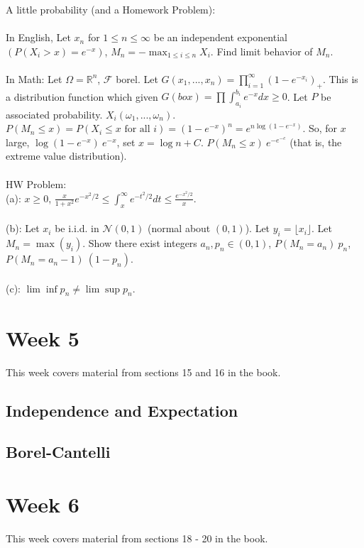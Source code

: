 \documentclass[12pt]{article}
\begin{document}
A little probability (and a Homework Problem):
\\ \\
In English, Let $x_n$ for $1 \le n \le \infty$ be an independent exponential $(P(X_i > x) = e^{-x})$, $M_n = -\max_{1 \le i \le n} X_i$.  Find limit behavior of $M_n$.
\\ \\
In Math: Let $\Omega = \mathbb{R}^n$, $\mathcal{F}$ borel.  Let $G(x_1, ..., x_n) = \prod_{i=1}^\infty (1 - e^{-x_i})_+$.  This is a distribution function which given $G(box) = \prod \int_{a_i}^{b_i} e^{-x} dx \ge 0$.  Let $P$ be associated probability.  $X_i(\omega_1, ..., \omega_n)$.  $P(M_n \le x) = P(X_i \le x \textrm{ for all } i) = (1 - e^{-x})^n = e^{n \log(1 - e^{-x})}$.  So, for $x$ large, $\log(1 - e^{-x}) ~ e^{-x}$, set $x = \log n + C$.  $P(M_n \le x) ~ e^{-e^{-c}}$ (that is, the extreme value distribution).
\\ \\
HW Problem: \\
(a): $x \ge 0$, $\frac{x}{1 + x^2} e^{-x^2/2} \le \int_x^\infty e^{-t^2/2} dt \le \frac{e^{-x^2/2}}{x}$.  \\ \\
(b): Let $x_i$ be i.i.d. in $\mathcal{N}(0,1)$ (normal about $(0,1)$).  Let $y_i = \lfloor x_i \rfloor$.  Let $M_n = \max(y_i)$.  Show there exist integers $a_n, p_n \in (0,1)$, $P(M_n = a_n) ~ p_n$, $P(M_n = a_n - 1) ~ (1 - p_n)$. \\ \\
(c):  $\lim \inf p_n \neq \lim \sup p_n$.

\section{Week 5}
This week covers material from sections 15 and 16 in the book.

\subsection{Independence and Expectation}

\subsection{Borel-Cantelli}


\section{Week 6}
This week covers material from sections 18 - 20 in the book.
\end{document}
